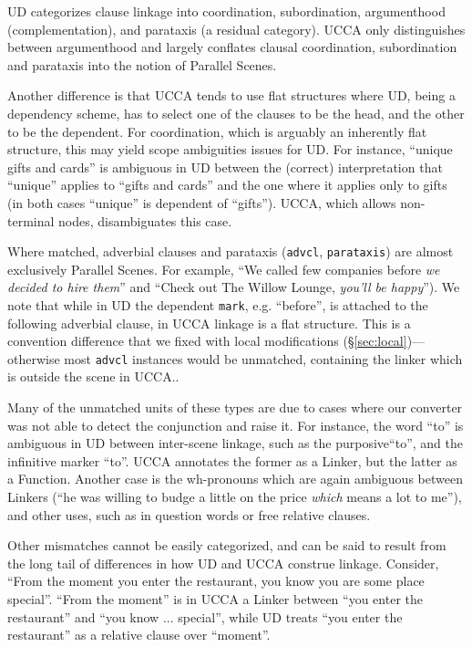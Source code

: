 \documentclass[11pt,a4paper]{article}
\newcommand{\daniel}[1]{\footnote{\color{blue}DH: #1}}
\begin{document}

UD categorizes clause linkage into coordination,
subordination, argumenthood (complementation),
and parataxis (a residual category).
UCCA only distinguishes between argumenthood 
and largely conflates clausal coordination, subordination and parataxis into the notion
of Parallel Scenes.

Another difference is that UCCA tends to use flat structures where UD, being a dependency scheme,
has to select one of the clauses to be the head, and the other to be the dependent. For coordination,
which is arguably an inherently flat structure, this may yield scope ambiguities issues for UD. 
For instance, ``unique gifts and cards'' is ambiguous in UD between the (correct) interpretation 
that ``unique'' applies to ``gifts and cards'' and the one where it applies only to gifts (in both
cases ``unique'' is dependent of ``gifts''). UCCA, which allows non-terminal nodes, disambiguates
this case.

Where matched, adverbial clauses and parataxis (\texttt{advcl}, \texttt{parataxis})
are almost exclusively Parallel Scenes.
For example, ``We called few companies before \textit{we decided to hire them}''
and ``Check out The Willow Lounge, \textit{you'll be happy}'').
We note that while in UD the dependent \texttt{mark}, e.g. ``before'',
is attached to the following adverbial clause,
in UCCA linkage is a flat structure.
This is a convention difference that we fixed with local modifications
(\S\ref{sec:local})---otherwise most \texttt{advcl} instances would be unmatched,
containing the linker which is outside the scene in UCCA..

Many of the unmatched units of these types are due to cases where our converter was not able to detect the conjunction 
and raise it. 
For instance, the word ``to'' is ambiguous in UD between inter-scene linkage, such as the purposive``to'', and
the infinitive marker ``to''. UCCA annotates the former as a Linker, but the latter as a Function.
Another case is the wh-pronouns which are again ambiguous between Linkers (``he was willing to budge a little on the price {\it which} means a lot to me''),
and other uses, such as in question words or free relative clauses.

Other mismatches cannot be easily categorized, and can be said to result from the long tail of differences in how UD and UCCA construe linkage.
Consider, ``From the moment you enter the restaurant, you know you are some place special''. ``From the moment'' is in UCCA
a Linker between ``you enter the restaurant'' and ``you know ... special'', while UD treats ``you enter the restaurant'' as a relative
clause over ``moment''.
\end{document}
